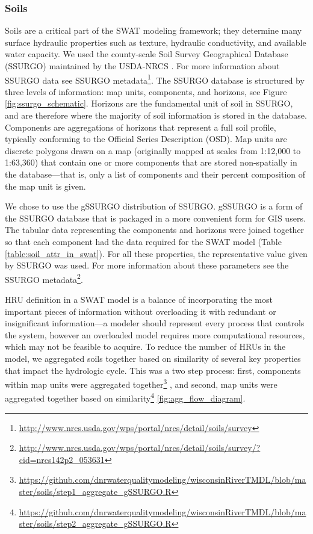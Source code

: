 \subsubsection{Soils}\label{sec:soils}
Soils are a critical part of the SWAT modeling framework; they determine many
surface hydraulic properties such as texture, hydraulic conductivity, and
available water capacity. We used the county-scale Soil Survey Geographical
Database (SSURGO) maintained by the USDA-NRCS \citep{staff_gridded_2014}. For more information about SSURGO
data see SSURGO metadata\footnote{\url{http://www.nrcs.usda.gov/wps/portal/nrcs/detail/soils/survey}}.
The SSURGO database is structured by three levels of information: map units,
components, and horizons, see Figure \ref{fig:ssurgo_schematic}. Horizons are the fundamental unit of soil in SSURGO, and are
therefore where the majority of soil information is stored in the database.
Components are aggregations of horizons that represent a full soil profile,
typically conforming to the Official Series Description (OSD). Map units
are discrete polygons drawn on a map (originally mapped at scales from 1:12,000
to 1:63,360) that contain one or more components that are stored non-spatially
in the database---that is, only a list of components and their percent
composition of the map unit is given. 

We chose to use the gSSURGO distribution of SSURGO. gSSURGO is a form of the SSURGO database that is packaged in a more convenient form for GIS users. The tabular data representing the components and
horizons were joined together so that each component had the data required for
the SWAT model (Table \ref{table:soil_attr_in_swat}). For all these properties, the representative value given by
SSURGO was used. For more information about these parameters see the SSURGO
metadata\footnote{\url{http://www.nrcs.usda.gov/wps/portal/nrcs/detail/soils/survey/?cid=nrcs142p2_053631}}.

HRU definition in a SWAT model is a balance of incorporating the most important
pieces of information without overloading it with redundant or insignificant
information---a modeler should represent every process that controls the system,
however an overloaded model requires more computational resources, which may not
be feasible to acquire. To reduce the number of HRUs in the model, we aggregated
soils together based on similarity of several key properties that impact the
hydrologic cycle. This was a two step process: first, components within map
units were aggregated
together\footnote{\url{https://github.com/dnrwaterqualitymodeling/wisconsinRiverTMDL/blob/master/soils/step1_aggregate_gSSURGO.R} } ,
and second, map units were aggregated together based on
similarity\footnote{\url{https://github.com/dnrwaterqualitymodeling/wisconsinRiverTMDL/blob/master/soils/step2_aggregate_gSSURGO.R}} \ref{fig:agg_flow_diagram}.

